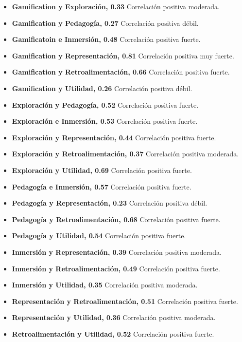 \begin{itemize}
\item \textbf{Gamification y Exploración, 0.33} Correlación positiva moderada.
\item \textbf{Gamification y Pedagogía, 0.27} Correlación positiva débil.
\item \textbf{Gamificatoin e Inmersión, 0.48} Correlación positiva fuerte.
\item \textbf{Gamification y Representación, 0.81} Correlación positiva muy fuerte.
\item \textbf{Gamification y Retroalimentación, 0.66} Correlación positiva fuerte.
\item \textbf{Gamification y Utilidad, 0.26} Correlación positiva débil.
\item \textbf{Exploración y Pedagogía, 0.52} Correlación positiva fuerte.
\item \textbf{Exploración e Inmersión, 0.53} Correlación positiva fuerte.
\item \textbf{Exploración y Representación, 0.44} Correlación positiva fuerte.
\item \textbf{Exploración y Retroalimentación, 0.37} Correlación positiva moderada.
\item \textbf{Exploración y Utilidad, 0.69} Correlación positiva fuerte.
\item \textbf{Pedagogía e Inmersión, 0.57} Correlación positiva fuerte.
\item \textbf{Pedagogía y Representación, 0.23} Correlación positiva débil.
\item \textbf{Pedagogía y Retroalimentación, 0.68} Correlación positiva fuerte.
\item \textbf{Pedagogía y Utilidad, 0.54} Correlación positiva fuerte.
\item \textbf{Inmersión y Representación, 0.39} Correlación positiva moderada.
\item \textbf{Inmersión y Retroalimentación, 0.49} Correlación positiva fuerte.
\item \textbf{Inmersión y Utilidad, 0.35} Correlación positiva moderada.
\item \textbf{Representación y Retroalimentación, 0.51} Correlación positiva fuerte.
\item \textbf{Representación y Utilidad, 0.36} Correlación positiva moderada.
\item \textbf{Retroalimentación y Utilidad, 0.52} Correlación positiva fuerte.
\end{itemize}

